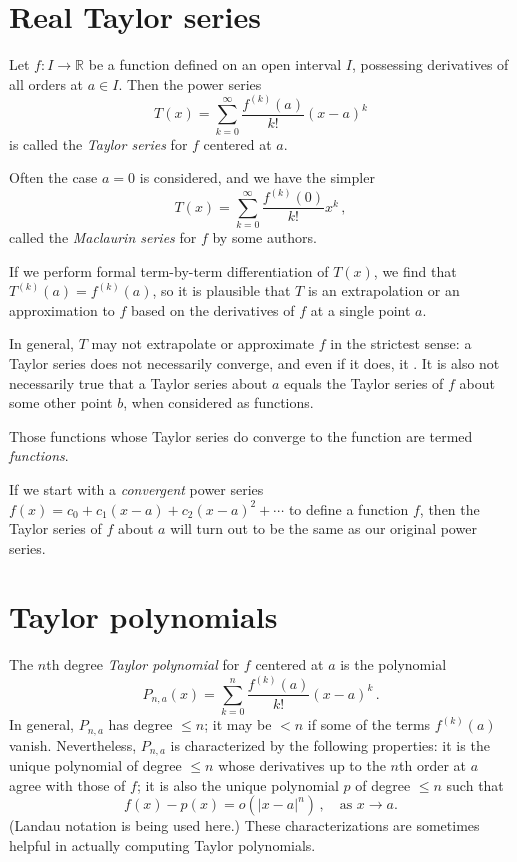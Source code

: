 \documentclass{article}
\newcommand{\real}{\mathbb{R}}
\providecommand{\abs}[1]{\lvert#1\rvert}
\providecommand{\defnterm}[1]{\emph{#1}}
\begin{document}
\tableofcontents

\section{Real Taylor series}
Let $f\colon I \to \real$  be a function defined on an open interval $I$,
possessing derivatives of all orders at $a \in I$.
Then the power series
\[
T(x) = \sum_{k=0}^{\infty} \frac{f^{(k)}(a)}{k!}(x-a)^k 
\]
is called the \defnterm{Taylor series} for $f$ centered at $a$.

Often the case $a = 0$  is considered, and we have the simpler
\[
T(x) = \sum_{k=0}^{\infty} \frac{f^{(k)}(0)}{k!}x^k\,, 
\]
called the \defnterm{Maclaurin series} for $f$ by some authors.

If we perform formal term-by-term differentiation of $T(x)$,
we find that $T^{(k)}(a) = f^{(k)}(a)$, so it is plausible 
that $T$ is an extrapolation or an approximation to $f$ based 
on the derivatives of $f$ at a single point $a$.

In general, $T$ may not extrapolate or approximate $f$ in the strictest sense:
 a Taylor series does not necessarily converge, and even if it does, 
it .  It is also not necessarily true that a Taylor series about $a$ equals the Taylor series of $f$ about some other point $b$,
when considered as functions.

Those functions whose Taylor series do converge
to the function are termed 
\defnterm{ functions}.

If we start with a \emph{convergent} power series 
$f(x) = c_0 + c_1 (x-a) + c_2 (x-a)^2 + \dotsb$ to 
define a function $f$, then the Taylor series of $f$
about $a$ will turn out to be the same as our original power series.

\section{Taylor polynomials}
The $n$th degree \defnterm{Taylor polynomial} for $f$ centered at $a$
is the polynomial
\[
P_{n,a}(x) = \sum_{k=0}^{n} \frac{f^{(k)}(a)}{k!}(x-a)^k \,.
\]
In general, $P_{n,a}$ has degree $\leq n$;
it may be $< n$ if some of the terms $f^{(k)}(a)$
vanish.  Nevertheless, $P_{n,a}$
is characterized by the following properties:
it is the unique polynomial of degree $\leq n$
whose derivatives up to the $n$th order at $a$ agree
with those of $f$;
it is also the unique polynomial $p$ of degree $\leq n$
such that
\[
f(x) - p(x)  = o(\abs{x-a}^n)\,,  \quad \textrm{as $x \to a$}.
\]
(Landau notation is being used here.)  
These characterizations are sometimes helpful in
actually computing Taylor polynomials.
\end{document}
